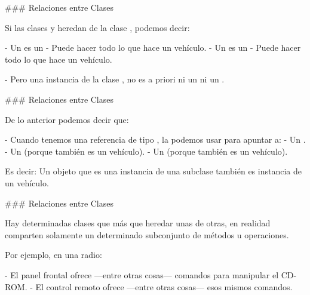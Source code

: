 ### Relaciones entre Clases

\newline

Si las clases  y  heredan de la clase , podemos decir:

\vspace{-1em}
\columnsbegin


- Un  es un 
    - Puede hacer todo lo que hace un vehículo.
- Un  es un 
    - Puede hacer todo lo que hace un vehículo.

- Pero una instancia de la clase , no es a priori ni un  ni un .


\centering{}

\columnsend

### Relaciones entre Clases

\newline

De lo anterior podemos decir que:

- Cuando tenemos una referencia de tipo , la podemos usar para apuntar a:
    - Un .
    - Un  (porque también es un vehículo).
    - Un  (porque también es un vehículo).

Es decir:
\vspace{-2em}
\importantboxbegin{}
Un objeto que es una instancia de una subclase también es instancia de un vehículo.
\importantboxend


### Relaciones entre Clases

\newline

Hay determinadas clases que más que heredar unas de otras, en realidad comparten
solamente un determinado subconjunto de métodos u operaciones.\newline

Por ejemplo, en una radio:

- El panel frontal ofrece ---entre otras cosas--- comandos para manipular el CD-ROM.
- El control remoto ofrece ---entre otras cosas--- esos mismos comandos.

